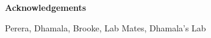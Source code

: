 \begin{doublespace}
  \begin{center}
    \textbf{Acknowledgements}
  \end{center}
  Perera, Dhamala, Brooke, Lab Mates, Dhamala's Lab
\end{doublespace}